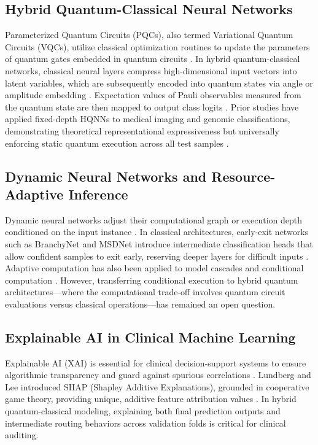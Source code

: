 \documentclass[conference]{IEEEtran}
\begin{document}
\subsection{Hybrid Quantum-Classical Neural Networks}
Parameterized Quantum Circuits (PQCs), also termed Variational Quantum Circuits (VQCs), utilize classical optimization routines to update the parameters of quantum gates embedded in quantum circuits \cite{biamonte2017quantum, cerezo2021variational, bharti2022noisy, mitarai2018quantum}. In hybrid quantum-classical networks, classical neural layers compress high-dimensional input vectors into latent variables, which are subsequently encoded into quantum states via angle or amplitude embedding \cite{schuld2019quantum, havlicek2019supervised, abbas2021power, huang2022quantum}. Expectation values of Pauli observables measured from the quantum state are then mapped to output class logits \cite{bergholm2018pennylane}. Prior studies have applied fixed-depth HQNNs to medical imaging and genomic classifications, demonstrating theoretical representational expressiveness but universally enforcing static quantum execution across all test samples \cite{cerezo2021variational, bharti2022noisy}.

\subsection{Dynamic Neural Networks and Resource-Adaptive Inference}
Dynamic neural networks adjust their computational graph or execution depth conditioned on the input instance \cite{han2021dynamic}. In classical architectures, early-exit networks such as BranchyNet \cite{teerapittayanon2016branchynet} and MSDNet \cite{huang2018multi} introduce intermediate classification heads that allow confident samples to exit early, reserving deeper layers for difficult inputs \cite{xin2024early}. Adaptive computation has also been applied to model cascades and conditional computation \cite{han2021dynamic}. However, transferring conditional execution to hybrid quantum architectures---where the computational trade-off involves quantum circuit evaluations versus classical operations---has remained an open question.

\subsection{Explainable AI in Clinical Machine Learning}
Explainable AI (XAI) is essential for clinical decision-support systems to ensure algorithmic transparency and guard against spurious correlations \cite{lundberg2017unified, ribeiro2016why}. Lundberg and Lee introduced SHAP (Shapley Additive Explanations), grounded in cooperative game theory, providing unique, additive feature attribution values \cite{lundberg2017unified}. In hybrid quantum-classical modeling, explaining both final prediction outputs and intermediate routing behaviors across validation folds is critical for clinical auditing.
\end{document}
